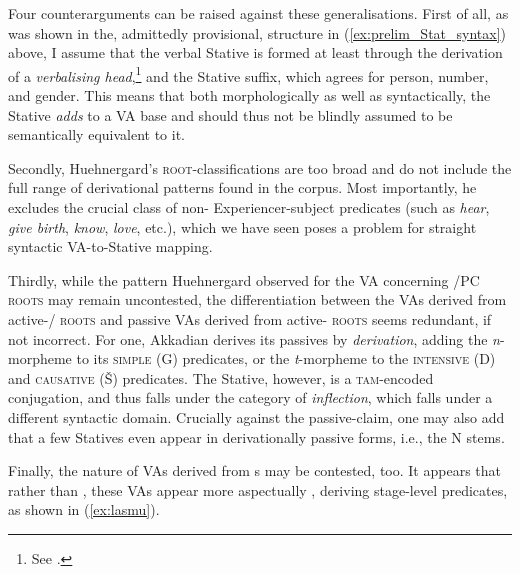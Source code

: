 \documentclass[output=paper,colorlinks,citecolor=brown]{langscibook}
\begin{document}
 Four counterarguments can be raised against these generalisations. First of all, as was shown in the, admittedly provisional, structure in (\ref{ex:prelim_Stat_syntax}) above, I assume that the verbal Stative is formed at least through the derivation of a \textit{verbalising head},\footnote{See \citet{kamil2023stative}.} and the Stative suffix, which agrees for person, number, and gender. This means that both morphologically as well as syntactically, the Stative \textit{adds} to a VA base and should thus not be blindly assumed to be semantically equivalent to it. 

Secondly, Huehnergard's \textsc{root}-classifications are too broad and do not include the full range of derivational patterns found in the corpus. Most importantly, he excludes the crucial class of non- Experiencer-subject  predicates (such as \textit{hear}, \textit{give birth}, \textit{know}, \textit{love}, etc.), which we have seen poses a problem for straight syntactic VA-to-Stative mapping. 

Thirdly, while the pattern Huehnergard observed for the VA concerning /PC \textsc{roots} may remain uncontested, the differentiation between the  VAs derived from active-/ \textsc{roots} and passive VAs derived from active- \textsc{roots} seems redundant, if not incorrect. For one, Akkadian derives its passives by \textit{derivation}, adding the \textit{n}-morpheme  to its \textsc{simple} (G) predicates, or the \textit{t}-morpheme to the \textsc{intensive} (D) and \textsc{causative} (Š) predicates. The Stative, however, is a \textsc{tam}-encoded conjugation, and thus falls under the category of \textit{inflection}, which falls under a different syntactic domain. Crucially against the passive-claim, one may also add that a few Statives even appear in derivationally passive forms, i.e., the N stems.

Finally, the  nature of VAs derived from s may be contested, too. It appears that rather than , these VAs appear more aspectually , deriving stage-level predicates, as shown in (\ref{ex:lasmu}).
\end{document}
